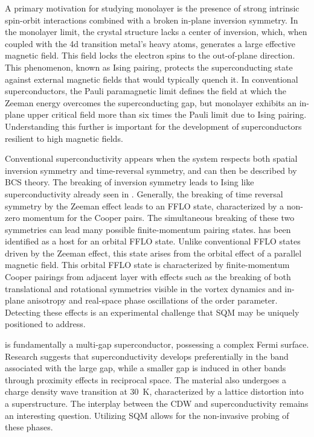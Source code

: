 A primary motivation for studying monolayer  is the presence of strong intrinsic spin-orbit interactions combined with a broken in-plane inversion symmetry. In the monolayer limit, the crystal structure lacks a center of inversion, which, when coupled with the 4d transition metal's heavy atoms, generates a large effective magnetic field. This field locks the electron spins to the out-of-plane direction\cite{xuSpinPseudospinsLayered2014}. This phenomenon, known as Ising pairing, protects the superconducting state against external magnetic fields that would typically quench it\cite{xiIsingPairingSuperconducting2016}. In conventional superconductors, the Pauli paramagnetic limit\cite{makiPauliParamagnetismSuperconducting1964} defines the field at which the Zeeman energy overcomes the superconducting gap, but monolayer  exhibits an in-plane upper critical field more than six times the Pauli limit due to Ising pairing. Understanding this further is important for the development of superconductors resilient to high magnetic fields.

Conventional superconductivity appears when the system respects both spatial inversion symmetry and time-reversal symmetry, and can then be described by BCS theory. The breaking of inversion symmetry leads to Ising like superconductivity already seen in . Generally, the breaking of time reversal symmetry by the Zeeman effect leads to an \gls{FFLO} state\cite{larkinNONUNIFORMSTATESUPERCONDUCTORS1964,fuldeSuperconductivityStrongSpinExchange1964}, characterized by a non-zero momentum for the Cooper pairs. The simultaneous breaking of these two symmetries can lead many possible finite-momentum pairing states\cite{liuUnconventionalSuperconductivityBilayer2017,wanOrbitalFuldeFerrell2023}.  has been identified as a host for an orbital \gls{FFLO} state. Unlike conventional \gls{FFLO} states driven by the Zeeman effect, this state arises from the orbital effect of a parallel magnetic field. This orbital \gls{FFLO} state is characterized by finite-momentum Cooper pairings from adjacent layer with effects such as the breaking of both translational and rotational symmetries visible in the vortex dynamics and in-plane anisotropy and real-space phase oscillations of the order parameter\cite{wanOrbitalFuldeFerrell2023}. Detecting these effects is an experimental challenge that \gls{SQM} may be uniquely positioned to address.

 is fundamentally a multi-gap superconductor, possessing a complex Fermi surface. Research suggests that superconductivity develops preferentially in the band associated with the large gap, while a smaller gap is induced in other bands through proximity effects in reciprocal space\cite{noatQuasiparticleSpectra22015,yokoyaFermiSurfaceSheetDependent2001}. The material also undergoes a charge density wave transition at \qty{30}{\kelvin}, characterized by a lattice distortion into a superstructure\cite{wilsonChargeDensityWavesMetallic1974,malliakasNbNbInteractions2013}. The interplay between the CDW and superconductivity remains an interesting question. Utilizing \gls{SQM} allows for the non-invasive probing of these phases.

